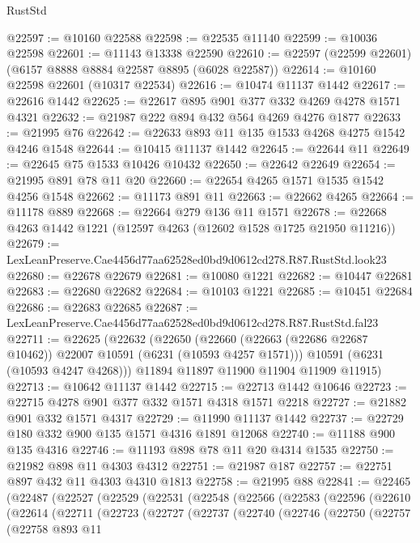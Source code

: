 \begin{lexlean}{RustStd}
\begin{coremodule}
{{@22597 := @10160 @22588
@22598 := @22535 @11140
@22599 := @10036 @22598
@22601 := @11143 @13338 @22590
@22610 := @22597 (@22599 @22601) (@6157 @8888 @8884 @22587 @8895 (@6028 @22587))
@22614 := @10160 @22598 @22601 (@10317 @22534)
@22616 := @10474 @11137 @1442
@22617 := @22616 @1442
@22625 := @22617 @895 @901 @377 @332 @4269 @4278 @1571 @4321
@22632 := @21987 @222 @894 @432 @564 @4269 @4276 @1877
@22633 := @21995 @76
@22642 := @22633 @893 @11 @135 @1533 @4268 @4275 @1542 @4246 @1548
@22644 := @10415 @11137 @1442
@22645 := @22644 @11
@22649 := @22645 @75 @1533 @10426 @10432
@22650 := @22642 @22649
@22654 := @21995 @891 @78 @11 @20
@22660 := @22654 @4265 @1571 @1535 @1542 @4256 @1548
@22662 := @11173 @891 @11
@22663 := @22662 @4265
@22664 := @11178 @889
@22668 := @22664 @279 @136 @11 @1571
@22678 := @22668 @4263 @1442 @1221 (@12597 @4263 (@12602 @1528 @1725 @21950 @11216))
@22679 := LexLeanPreserve.Cae4456d77aa62528ed0bd9d0612cd278.R87.RustStd.look23
@22680 := @22678 @22679
@22681 := @10080 @1221
@22682 := @10447 @22681
@22683 := @22680 @22682
@22684 := @10103 @1221
@22685 := @10451 @22684
@22686 := @22683 @22685
@22687 := LexLeanPreserve.Cae4456d77aa62528ed0bd9d0612cd278.R87.RustStd.fal23
@22711 := @22625
    (@22632
      (@22650
        (@22660 (@22663 (@22686 @22687 @10462)) @22007 @10591 (@6231 (@10593 @4257 @1571)))
        @10591
        (@6231 (@10593 @4247 @4268)))
      @11894
      @11897
      @11900
      @11904
      @11909
      @11915)
@22713 := @10642 @11137 @1442
@22715 := @22713 @1442 @10646
@22723 := @22715 @4278 @901 @377 @332 @1571 @4318 @1571 @2218
@22727 := @21882 @901 @332 @1571 @4317
@22729 := @11990 @11137 @1442
@22737 := @22729 @180 @332 @900 @135 @1571 @4316 @1891 @12068
@22740 := @11188 @900 @135 @4316
@22746 := @11193 @898 @78 @11 @20 @4314 @1535
@22750 := @21982 @898 @11 @4303 @4312
@22751 := @21987 @187
@22757 := @22751 @897 @432 @11 @4303 @4310 @1813
@22758 := @21995 @88
@22841 := @22465
    (@22487
      (@22527
        (@22529
          (@22531
            (@22548
              (@22566
                (@22583
                  (@22596
                    (@22610
                      (@22614
                        (@22711
                          (@22723
                            (@22727
                              (@22737
                                (@22740
                                  (@22746
                                    (@22750
                                      (@22757
                                        (@22758
                                          @893
                                          @11
}}
\end{coremodule}
\end{lexlean}
